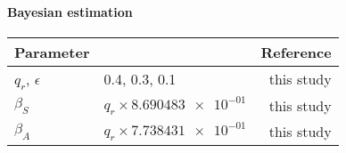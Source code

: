 \paragraph{Bayesian estimation}
  \begin{table*}
    \centering
    \begin{tabular}{@{}llr@{}}
    \toprule
        Parameter
        &   \centering{Median}
        &   Reference
        \\
        \midrule
          $q_r$, $\epsilon$
            &
              \num{.4}, \num{.3}, \num{.1}
            &
              this study
        \\
            $\beta_S$
            & $q_r \times \num{8.690483e-01} $
            & this study
        \\
            $\beta_A$
            & $q_r \times \num{7.738431e-01}$
            & this study
        

\end{tabular}
\end{table*}
